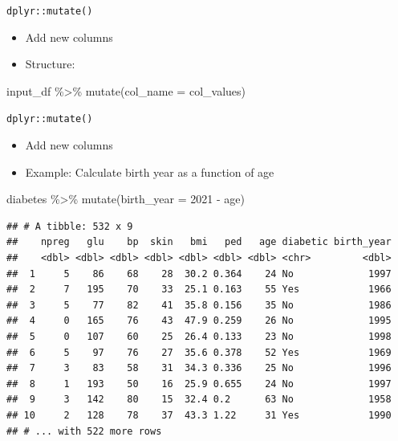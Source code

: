 \documentclass[
  ignorenonframetext,
]{beamer}
\newenvironment{Shaded}{\begin{snugshade}}{\end{snugshade}}
\newcommand{\AttributeTok}[1]{\textcolor[rgb]{0.77,0.63,0.00}{#1}}
\newcommand{\DecValTok}[1]{\textcolor[rgb]{0.00,0.00,0.81}{#1}}
\newcommand{\FunctionTok}[1]{\textcolor[rgb]{0.00,0.00,0.00}{#1}}
\newcommand{\NormalTok}[1]{#1}
\newcommand{\SpecialCharTok}[1]{\textcolor[rgb]{0.00,0.00,0.00}{#1}}
\providecommand{\tightlist}{%
  \setlength{\itemsep}{0pt}\setlength{\parskip}{0pt}}
\begin{document}
\begin{frame}[fragile]{\texttt{dplyr::mutate()}}
\protect\hypertarget{dplyrmutate}{}
\begin{itemize}
\tightlist
\item
  Add new columns
\item
  Structure:
\end{itemize}

\begin{Shaded}
\begin{Highlighting}[]
\NormalTok{input\_df }\SpecialCharTok{\%\textgreater{}\%} 
  \FunctionTok{mutate}\NormalTok{(}\AttributeTok{col\_name =}\NormalTok{ col\_values)}
\end{Highlighting}
\end{Shaded}
\end{frame}

\begin{frame}[fragile]{\texttt{dplyr::mutate()}}
\protect\hypertarget{dplyrmutate-1}{}
\begin{itemize}
\tightlist
\item
  Add new columns
\item
  Example: Calculate birth year as a function of age
\end{itemize}

\begin{Shaded}
\begin{Highlighting}[]
\NormalTok{diabetes }\SpecialCharTok{\%\textgreater{}\%} 
  \FunctionTok{mutate}\NormalTok{(}\AttributeTok{birth\_year =} \DecValTok{2021} \SpecialCharTok{{-}}\NormalTok{ age)}
\end{Highlighting}
\end{Shaded}

\begin{verbatim}
## # A tibble: 532 x 9
##    npreg   glu    bp  skin   bmi   ped   age diabetic birth_year
##    <dbl> <dbl> <dbl> <dbl> <dbl> <dbl> <dbl> <chr>         <dbl>
##  1     5    86    68    28  30.2 0.364    24 No             1997
##  2     7   195    70    33  25.1 0.163    55 Yes            1966
##  3     5    77    82    41  35.8 0.156    35 No             1986
##  4     0   165    76    43  47.9 0.259    26 No             1995
##  5     0   107    60    25  26.4 0.133    23 No             1998
##  6     5    97    76    27  35.6 0.378    52 Yes            1969
##  7     3    83    58    31  34.3 0.336    25 No             1996
##  8     1   193    50    16  25.9 0.655    24 No             1997
##  9     3   142    80    15  32.4 0.2      63 No             1958
## 10     2   128    78    37  43.3 1.22     31 Yes            1990
## # ... with 522 more rows
\end{verbatim}
\end{frame}
\end{document}
